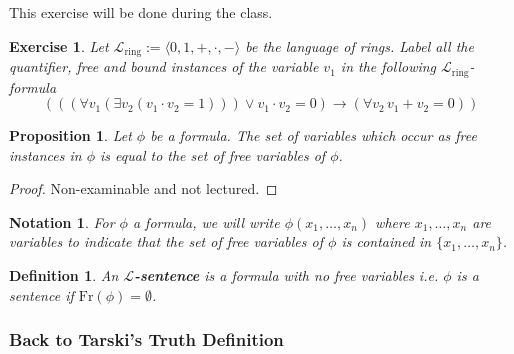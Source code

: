 \documentclass[11pt]{article}
\newtheorem{proposition}[theorem]{Proposition}
\newtheorem{exercise}[theorem]{Exercise}
\newtheorem{definition}[theorem]{Definition}
\newtheorem{notation}[theorem]{Notation}
\newcommand{\mcal}[1]{\mathcal{#1}}
\begin{document}
This exercise will be done during the class.
\begin{exercise}
Let $\mcal{L}_{\textrm{ring}}:=\langle 0,1,+,\cdot, -\rangle$ be the language of rings.
Label all the quantifier, free and bound instances of the variable $v_1$ in the following $\mcal{L}_{\textrm{ring}}$-formula
\[(((\forall v_1(\exists v_2 (v_1\cdot v_2=1)))\vee v_1\cdot v_2=0)\rightarrow (\forall v_2 \, v_1+v_2=0))\]
\end{exercise}

\begin{proposition}
Let $\phi$ be a formula. The set of variables which occur as free instances in $\phi$ is equal to the set of free variables of $\phi$.
\end{proposition}
\begin{proof}
Non-examinable and not lectured.
\end{proof}

\begin{notation}
For $\phi$ a formula, we will write $\phi(x_1,\ldots, x_n)$ where $x_1,\ldots,x_n$ are variables to indicate that the set of free variables of $\phi$ is contained in $\{x_1,\ldots,x_n\}$.
\end{notation}


\begin{definition}
An \textbf{$\mcal{L}$-sentence} is a formula with no free variables i.e. $\phi$ is a sentence if $\textrm{Fr}(\phi)=\emptyset$.
\end{definition}

\subsubsection*{Back to Tarski's Truth Definition}
\end{document}
